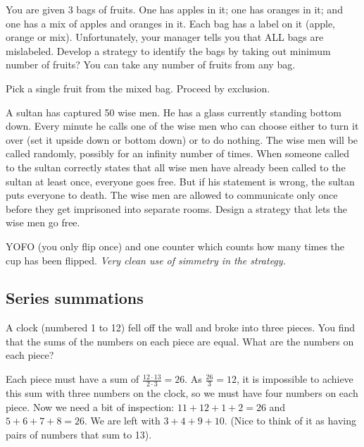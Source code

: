 \begin{qanda}
    \Q
    You are given 3 bags of fruits. One has apples in it; one has oranges in it; and one has a mix of apples and oranges in it. 
    Each bag has a label on it (apple, orange or mix).
    Unfortunately, your manager tells you that ALL bags are mislabeled. Develop a strategy to identify the bags by taking out minimum number of fruits? You can take any number of fruits from any bag.

    \A Pick a single fruit from the mixed bag. Proceed by exclusion.
  
\end{qanda}

\begin{qanda} %
    \Q
    A sultan has captured 50 wise men.
    He has a glass currently standing bottom down. Every minute he calls one of the wise men who can choose either to turn it over (set it upside down or bottom down) or to do nothing. 
    The wise men will be called randomly, possibly for an infinity number of times. 
    When someone called to the sultan correctly states that all wise men have already been called to the sultan at least once, everyone goes free.
    But if his statement is wrong, the sultan puts everyone to death.
    The wise men are allowed to communicate only once before they get imprisoned into separate rooms. Design a strategy that lets the wise men go free.

     YOFO (you only flip once) and one counter which counts how many times the cup has been flipped.
    \emph{Very clean use of simmetry in the strategy.}
\end{qanda}


\subsection{Series summations}

\begin{qanda} %
  
    \Q 
    A clock (numbered 1 to 12) fell off the wall and broke into three pieces.
    You find that the sums of the numbers on each piece are equal. What are the numbers on each piece?

    \A Each piece must have a sum of $\frac{12\cdot 13}{2\cdot 3}=26$. As $\frac{26}{3}=12$, it is impossible to achieve this sum with three numbers on the clock, so we must have four numbers on each piece. Now we need a bit of inspection: $11 + 12 + 1 + 2 = 26$ and $5 + 6 + 7 + 8=26$. We are left with $3 + 4 + 9 + 10$. (Nice to think of it as having pairs of numbers that sum to 13).

\end{qanda}

